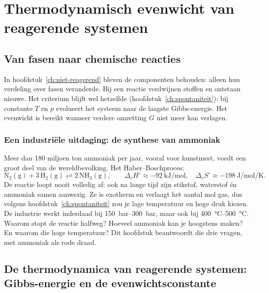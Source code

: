 \chapter{Thermodynamisch evenwicht van reagerende systemen}
\label{ch:reagerend}

\section{Van fasen naar chemische reacties}

In hoofdstuk~\ref{ch:niet-reagerend} bleven de componenten behouden: alleen hun verdeling over fasen veranderde. Bij een reactie verdwijnen stoffen en ontstaan nieuwe. Het criterium blijft wel hetzelfde (hoofdstuk~\ref{ch:spontaniteit}): bij constante $T$ en $p$ evolueert het systeem naar de laagste Gibbs-energie. Het evenwicht is bereikt wanneer verdere omzetting $G$ niet meer kan verlagen.

\subsection{Een industri\"ele uitdaging: de synthese van ammoniak}
\label{sec:haber-bosch}

Meer dan 180 miljoen ton ammoniak per jaar, vooral voor kunstmest, voedt een groot deel van de wereldbevolking. Het Haber--Boschproces:
\begin{equation}
\mathrm{N_2(g) + 3\,H_2(g) \rightleftharpoons 2\,NH_3(g)}, \qquad \Delta_r H^\circ \approx \SI{-92}{\kilo\joule\per\mole}, \quad \Delta_rS^\circ \approx \SI{-198}{\joule\per\mole\per\kelvin}.
\end{equation}
De reactie loopt nooit volledig af: ook na lange tijd zijn stikstof, waterstof \'en ammoniak samen aanwezig. Ze is exotherm en verlaagt het aantal mol gas, dus volgens hoofdstuk~\ref{ch:spontaniteit} zou je lage temperatuur en hoge druk kiezen. De industrie werkt inderdaad bij \SIrange{150}{300}{\bar}, maar ook bij \SIrange{400}{500}{\celsius}. Waarom stopt de reactie halfweg? Hoeveel ammoniak kan je hoogstens maken? En waarom die hoge temperatuur? Dit hoofdstuk beantwoordt die drie vragen, met ammoniak als rode draad.

\section{De thermodynamica van reagerende systemen: Gibbs-energie en de evenwichtsconstante}

